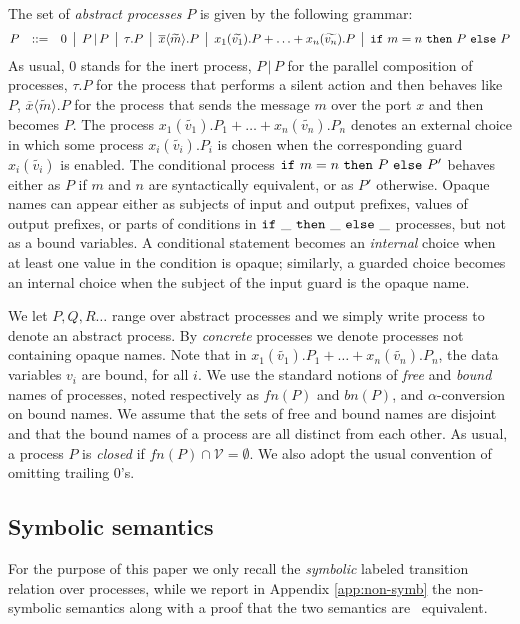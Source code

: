 \documentclass[submission,copyright,creativecommons]{eptcs}
\newcommand{\outp}[2]{\overline{#1}\langle{#2}\rangle}
\newcommand{\inp}[2]{#1(#2)}
\newcommand{\ifte}[3]{{\tt if}\ #1\ {\tt then }\ #2\ {\tt else }\ #3}
\newcommand{\fn}{\mathit{fn}}
\newcommand{\bn}{\mathit{bn}}
\newcommand{\tuple}[1]{\widetilde{#1}}
\newcommand{\orbar}{\,\mathrel{\big|}\,}
\newcommand{\as}{\,\mathrel{::=}\,}
\begin{document}
The set of {\em abstract processes} $P$ is given by the following grammar:
\[
  P \;\; \as \;\; 0 \orbar P \,| \, P
     \orbar \tau.P
     \orbar \outp{x}{\tuple m}.P
     \orbar \inp{x_1}{\tuple{v_1}}.P+\ldots+\inp{x_n}{\tuple{v_n}}.P
     \orbar \ifte{m=n}P P
\]
As usual, $0$ stands for the inert process, $P\,|\,P$ for the 
parallel composition of processes, 
$\tau.P$ for the process that performs a silent action and then behaves 
like $P$, $\outp{x}{\tuple{m}}.P$ for the process that sends the message 
$m$ over the port $x$ and then becomes $P$. The process
$\inp{x_1}{\tuple{v_1}}.P_1+\ldots+\inp{x_n}{\tuple{v_n}} .P_n$
denotes an external choice in which some process $\inp{x_i}
{\tuple{v_i}}.P_i$ is chosen when the corresponding guard $\inp{x_i}
{\tuple{v_i}}$ is enabled. The conditional process $\ifte{m=n}P P'$
behaves either as $P$ if $m$ and $n$ are syntactically equivalent, or
as $P'$ otherwise. Opaque names can appear either as subjects of 
input and output prefixes, values of output prefixes, or parts of 
conditions in $\ifte{\_}{\_}{\_}$ processes, but not as a bound variables. 
A conditional statement becomes an \emph{internal} choice when 
at least one value in the condition is opaque; similarly, a guarded choice  
becomes an internal choice when the subject of the input guard is the opaque 
name. 

We let $P,Q,R \ldots$ range over abstract processes and we simply write 
process to denote an abstract process. By \emph{concrete} processes we 
denote processes not containing opaque names. Note that in 
$\inp{x_1}{\tuple{v_1}}.P_1+\ldots+\inp{x_n}{\tuple{v_n}}.P_n$, the data 
variables $v_i$ are bound, for all $i$. We use the standard notions 
of {\it free} and {\it bound} names of processes, noted respectively as 
$\fn(P)$ and $\bn(P)$, and $\alpha$-conversion on bound names. We assume 
that the sets of free and bound names are disjoint 
and that the bound names of a process are all distinct from each other. 
As usual, a process $P$ is {\em closed} if $\fn(P) \cap \mathcal{V} =
\emptyset$. We also adopt the usual convention of omitting trailing $0$'s. 

\subsection{Symbolic semantics}
For the purpose of this paper we only recall the \emph{symbolic} labeled 
transition relation over processes, 
while we report in Appendix \ref{app:non-symb} the non-symbolic semantics along with a proof that the two semantics are \
equivalent.
\end{document}
